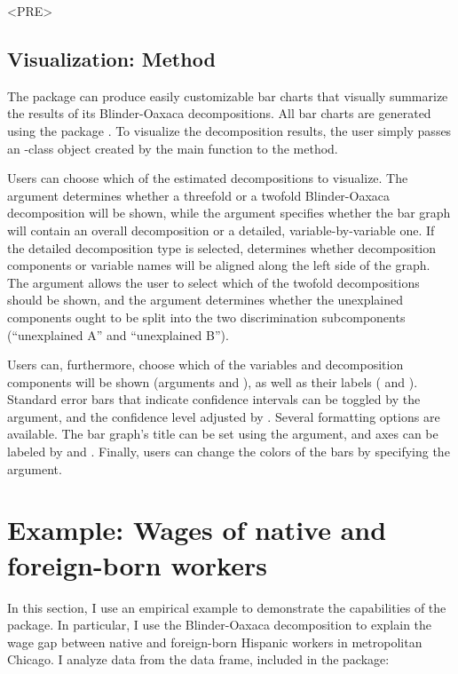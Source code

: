 <PRE>\documentclass[nojss]{jss}
\begin{document}
\subsection[Visualization: Method plot()]{Visualization: Method }

The  package can produce easily customizable bar charts that visually summarize the results of its Blinder-Oaxaca decompositions. All bar charts are generated using the  package \citep{Wickham2009}. To visualize the decomposition results, the user simply passes an -class object created by the main function  to the  method. 

Users can choose which of the estimated decompositions to visualize. The  argument determines whether a threefold or a twofold Blinder-Oaxaca decomposition will be shown, while the  argument specifies whether the bar graph will contain an overall decomposition or a detailed, variable-by-variable one. If the detailed decomposition type is selected,  determines whether decomposition components or variable names will be aligned along the left side of the graph. The argument  allows the user to select which of the twofold decompositions should be shown, and the  argument determines whether the unexplained components ought to be split into the two discrimination subcomponents (``unexplained A'' and ``unexplained B''). 

Users can, furthermore, choose which of the variables and decomposition components will be shown (arguments  and ), as well as their labels ( and ). Standard error bars that indicate confidence intervals can be toggled by the  argument, and the confidence level adjusted by . Several formatting options are available. The bar graph's title can be set using the  argument, and axes can be labeled by  and . Finally, users can change the colors of the bars by specifying the  argument. 

\section[Example: Wages of native and foreign-born workers]{Example: Wages of native and foreign-born workers}
\label{Section4}

In this section, I use an empirical example to demonstrate the capabilities of the  package. In particular, I use the Blinder-Oaxaca decomposition to explain the wage gap between native and foreign-born Hispanic workers in metropolitan Chicago. I analyze data from the  data frame, included in the  package:
\end{document}
